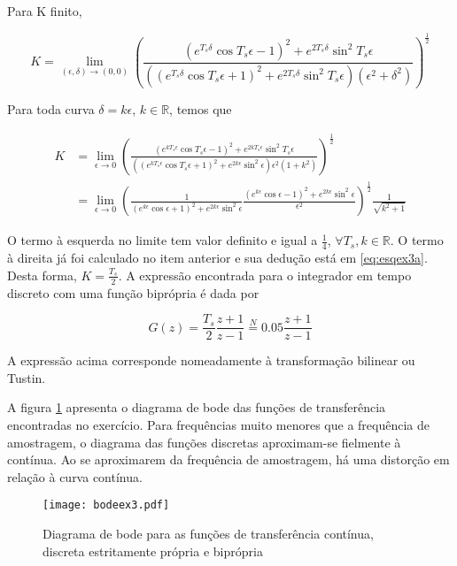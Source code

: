 \begin{enumerate}
        Para K finito, 
        
            \begin{equation}
                K = \lim\limits_{(\epsilon, \delta) \rightarrow (0, 0)} \left( \frac{(e^{T_s \delta} \cos T_s \epsilon - 1)^2 +  e^{2 T_s \delta} \sin^2 T_s \epsilon}{((e^{T_s \delta} \cos T_s \epsilon + 1)^2 +  e^{2 T_s \delta} \sin^2 T_s \epsilon) (\epsilon^2 + \delta^2)} \right)^{\frac{1}{2}}
            \end{equation}
        
        Para toda curva $\delta = k \epsilon$, $k \in \mathbb{R}$, temos que 

        \begin{equation}
            \begin{split}
                K &= \lim\limits_{\epsilon \rightarrow 0} \left( \frac{(e^{k T_s \epsilon} \cos T_s \epsilon - 1)^2 +  e^{2 k T_s \epsilon} \sin^2 T_s \epsilon}{((e^{k T_s \epsilon} \cos T_s \epsilon + 1)^2 +  e^{2 k \epsilon} \sin^2 \epsilon) \epsilon^2 (1 + k^2)} \right)^{\frac{1}{2}} \\
                & = \lim\limits_{\epsilon \rightarrow 0} \left( \frac{1}{(e^{k \epsilon} \cos \epsilon + 1)^2 +  e^{2 k \epsilon} \sin^2 \epsilon} \frac{(e^{k \epsilon} \cos \epsilon - 1)^2 +  e^{2 k \epsilon} \sin^2 \epsilon}{\epsilon^2} \right)^{\frac{1}{2}} \frac{1}{\sqrt{k^2 + 1}}
            \end{split}
        \end{equation}
        
        O termo à esquerda no limite tem valor definito e igual a $\frac{1}{4}$, $\forall T_s, k \in \mathbb{R}$. O termo à direita já foi calculado no item anterior e sua dedução está em \eqref{eq:esqex3a}. Desta forma, $K = \frac{T_s}{2}$. A expressão encontrada para o integrador em tempo discreto com uma função biprópria é dada por 
        
            \begin{equation}
                G(z) = \frac{T_s}{2} \frac{z + 1}{z - 1} \stackrel{N}{=} 0.05 \frac{z + 1}{z - 1}
            \end{equation}
        
        A expressão acima corresponde nomeadamente à transformação bilinear ou Tustin.
    
    A figura \ref{fig:ex3} apresenta o diagrama de bode das funções de transferência encontradas no exercício. Para frequências muito menores que a frequência de amostragem, o diagrama das funções discretas aproximam-se fielmente à contínua. Ao se aproximarem da frequência de amostragem, há uma distorção em relação à curva contínua.
            
    \begin{figure}[H]
        \texttt{[image: bodeex3.pdf]}
        \caption{\label{fig:ex3bode} Diagrama de bode para as funções de transferência contínua, discreta estritamente própria e biprópria} 
        \label{fig:ex3}
    \end{figure}

    \end{enumerate}